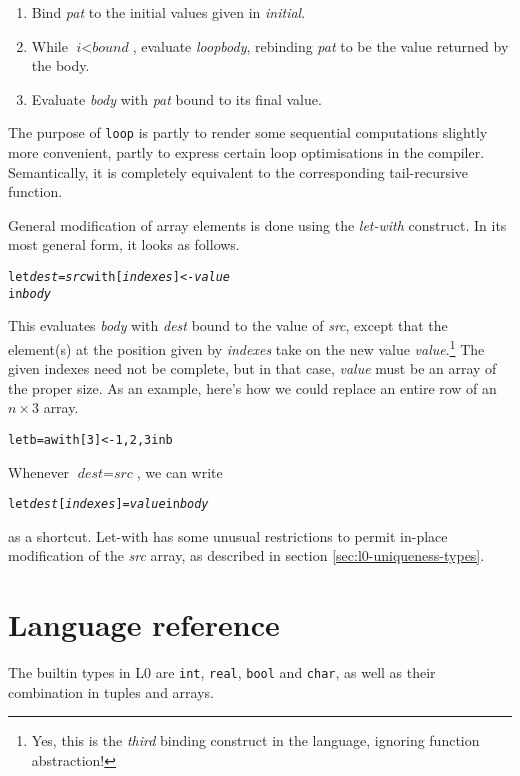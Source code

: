 \documentclass[oneside]{memoir}
\newcommand\boolt[0]{\texttt{bool}}
\newcommand\realt[0]{\texttt{real}}
\newcommand\chart[0]{\texttt{char}}
\newcommand\intt[0]{\texttt{int}}
\begin{document}
\begin{enumerate}
  \item Bind \textit{pat} to the initial values given in \textit{initial}.
  \item While $\textit{i} < \textit{bound}$, evaluate \textit{loopbody},
    rebinding \textit{pat} to be the value returned by the body.
  \item Evaluate \textit{body} with \textit{pat} bound to its final
    value.
\end{enumerate}
The purpose of \texttt{loop} is partly to render some sequential
computations slightly more convenient, partly to express certain loop
optimisations in the compiler.  Semantically, it is completely
equivalent to the corresponding tail-recursive function.

General modification of array elements is done using the
\emph{let-with} construct.  In its most general form, it looks as
follows.
\begin{alltt}
  let \textit{dest} = \textit{src} with [\textit{indexes}] <- \textit{value}
  in \textit{body}
\end{alltt}
This evaluates \textit{body} with \textit{dest} bound to the value of
\textit{src}, except that the element(s) at the position given by
\textit{indexes} take on the new value \textit{value}.\footnote{Yes,
  this is the \emph{third} binding construct in the language, ignoring
  function abstraction!}  The given indexes need not be complete, but
in that case, \textit{value} must be an array of the proper size.  As
an example, here's how we could replace an entire row of an
$n\times3$ array.
\begin{alltt}
  let b = a with [3] <- {1,2,3} in b
\end{alltt}
Whenever $\textit{dest} = \textit{src}$, we can write
\begin{alltt}
  let \textit{dest}[\textit{indexes}] = \textit{value} in \textit{body}
\end{alltt}
as a shortcut.  Let-with has some unusual restrictions to permit
in-place modification of the \textit{src} array, as described in
section \ref{sec:l0-uniqueness-types}.

\section{Language reference}
\label{sec:l0-reference}

The builtin types in L0 are \intt{}, \realt{}, \boolt{} and \chart{}, as
well as their combination in tuples and arrays.
\end{document}
